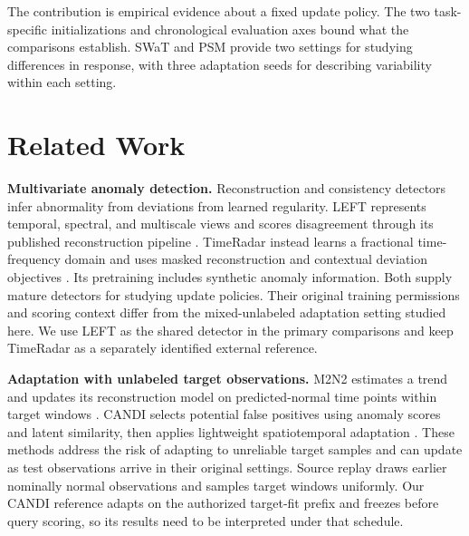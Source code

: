 \documentclass[pdflatex,sn-apa]{sn-jnl}
\begin{document}
The contribution is empirical evidence about a fixed update policy. The
two task-specific initializations and chronological evaluation axes
bound what the comparisons establish. SWaT and PSM provide two settings
for studying differences in response, with three adaptation seeds for
describing variability within each setting.

\section{Related Work}\label{related-work}

\textbf{Multivariate anomaly detection.} Reconstruction and consistency
detectors infer abnormality from deviations from learned regularity.
LEFT represents temporal, spectral, and multiscale views and scores
disagreement through its published reconstruction pipeline
\citep{left2026}. TimeRadar instead learns a fractional time-frequency
domain and uses masked reconstruction and contextual deviation
objectives \citep{timeradar2026}. Its pretraining includes synthetic
anomaly information. Both supply mature detectors for studying update
policies. Their original training permissions and scoring context differ
from the mixed-unlabeled adaptation setting studied here. We use LEFT as
the shared detector in the primary comparisons and keep TimeRadar as a
separately identified external reference.

\textbf{Adaptation with unlabeled target observations.} M2N2 estimates a
trend and updates its reconstruction model on predicted-normal time
points within target windows \citep{m2n22024}. CANDI selects potential
false positives using anomaly scores and latent similarity, then applies
lightweight spatiotemporal adaptation \citep{candi2026}. These methods
address the risk of adapting to unreliable target samples and can update
as test observations arrive in their original settings. Source replay
draws earlier nominally normal observations and samples target windows
uniformly. Our CANDI reference adapts on the authorized target-fit
prefix and freezes before query scoring, so its results need to be
interpreted under that schedule.
\end{document}
